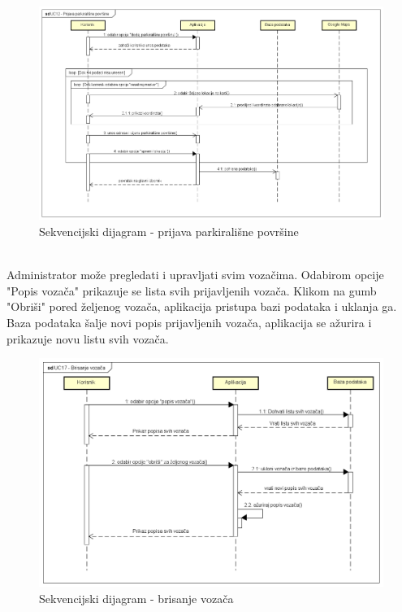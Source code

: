 			\begin{figure}[H]
				\includegraphics[scale=0.4]{dijagrami/sekvencijski dijagram - prijava parkirališne površine.png} %
				\centering
				\caption{Sekvencijski dijagram - prijava parkirališne površine}
				\label{fig:promjene}
			\end{figure}
			
				\newpage
				\\
				Administrator može pregledati i upravljati svim vozačima. Odabirom opcije "Popis vozača" prikazuje se lista svih prijavljenih vozača. Klikom na gumb "Obriši" pored željenog vozača, aplikacija pristupa bazi podataka i uklanja ga. Baza podataka šalje novi popis prijavljenih vozača, aplikacija se ažurira i prikazuje novu listu svih vozača.
			 \\
		
				\begin{figure}[H]
					\includegraphics[scale=0.5]{dijagrami/Sekvencijski dijagram - brisanje vozača.png} %
					\centering
					\caption{Sekvencijski dijagram - brisanje vozača}
					\label{fig:promjene}
				\end{figure}		
				
